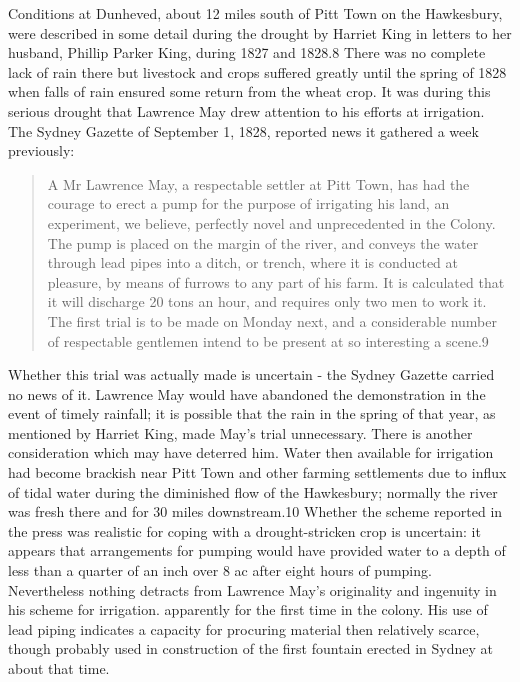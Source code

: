 Conditions at Dunheved, about 12 miles south of Pitt Town on the
Hawkesbury, were described in some detail during the drought by
Harriet King in letters to her husband, Phillip Parker King, during
1827 and 1828.8 There was no complete lack of rain there but livestock
and crops suffered greatly until the spring of 1828 when falls of rain
ensured some return from the wheat crop. It was during this serious
drought that Lawrence May drew attention to his efforts at
irrigation. The Sydney Gazette of September 1, 1828, reported news it
gathered a week previously:
\begin{quote}
	A Mr Lawrence May, a respectable settler at Pitt Town, has had
	the courage to erect a pump for the purpose of irrigating his
	land, an experiment, we believe, perfectly novel and
	unprecedented in the Colony. The pump is placed on the margin
	of the river, and conveys the water through lead pipes into a
	ditch, or trench, where it is conducted at pleasure, by means
	of furrows to any part of his farm. It is calculated that it
	will discharge 20 tons an hour, and requires only two men to
	work it. The first trial is to be made on Monday next, and a
	considerable number of respectable gentlemen intend to be
	present at so interesting a scene.9
\end{quote}

Whether this trial was actually made is uncertain - the Sydney Gazette
carried no news of it. Lawrence May would have abandoned the
demonstration in the event of timely rainfall; it is possible that the
rain in the spring of that year, as mentioned by Harriet King, made
May's trial unnecessary. There is another consideration which may have
deterred him. Water then available for irrigation had become brackish
near Pitt Town and other farming settlements due to influx of tidal
water during the diminished flow of the Hawkesbury; normally the river
was fresh there and for 30 miles downstream.10 Whether the scheme
reported in the press was realistic for coping with a drought-stricken
crop is uncertain: it appears that arrangements for pumping would have
provided water to a depth of less than a quarter of an inch over 8 ac
after eight hours of pumping. Nevertheless nothing detracts from
Lawrence May's originality and ingenuity in his scheme for
irrigation. apparently for the first time in the colony. His use of
lead piping indicates a capacity for procuring material then
relatively scarce, though probably used in construction of the first
fountain erected in Sydney at about that time.

